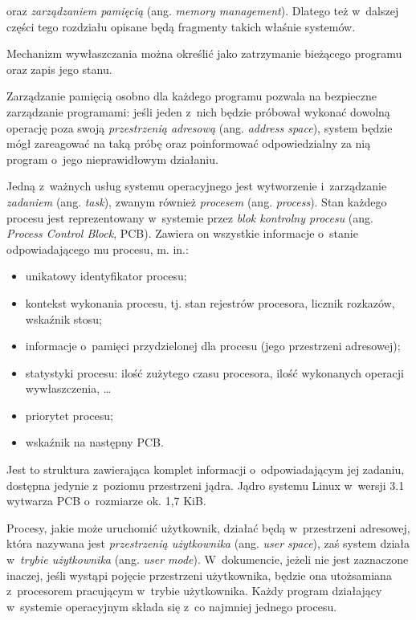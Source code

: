 \documentclass[12pt]{mwart}
\begin{document}
  oraz \emph{zarządzaniem pamięcią} (ang. \emph{memory management}). Dlatego też w~dalszej części tego rozdziału opisane będą fragmenty takich właśnie systemów.
\par
%
\indent
  Mechanizm wywłaszczania można określić jako zatrzymanie bieżącego programu oraz zapis jego stanu.
\par
%
\indent
  Zarządzanie pamięcią osobno dla każdego programu pozwala na bezpieczne zarządzanie programami: jeśli jeden z~nich będzie próbował wykonać dowolną operację
  poza swoją \emph{przestrzenią adresową} (ang. \emph{address space}), system będzie mógł zareagować na taką próbę oraz poinformować odpowiedzialny za nią program
  o~jego nieprawidłowym działaniu.
\par
%
\indent
  Jedną z~ważnych usług systemu operacyjnego jest wytworzenie i~zarządzanie \emph{zadaniem} (ang. \emph{task}), zwanym również \emph{procesem}
  (ang. \emph{process}). Stan każdego procesu jest reprezentowany w~systemie przez \emph{blok kontrolny procesu} (ang. \emph{Process Control Block}, PCB).
  Zawiera on wszystkie informacje o~stanie odpowiadającego mu procesu, m. in.:
  \begin{itemize}
    \item unikatowy identyfikator procesu;
    \item kontekst wykonania procesu, tj. stan rejestrów procesora, licznik rozkazów, wskaźnik stosu;
    \item informacje o~pamięci przydzielonej dla procesu (jego przestrzeni adresowej);
    \item statystyki procesu: ilość zużytego czasu procesora, ilość wykonanych operacji wywłaszczenia, \ldots
    \item priorytet procesu;
    \item wskaźnik na następny PCB.
  \end{itemize}
  Jest to struktura zawierająca komplet informacji o~odpowiadającym jej zadaniu, dostępna jedynie z~poziomu przestrzeni jądra.
  Jądro systemu Linux w~wersji 3.1 wytwarza PCB o~rozmiarze ok. 1,7 KiB.
\par
%
\indent
  Procesy, jakie może uruchomić użytkownik, działać będą w~przestrzeni adresowej, która nazywana jest \emph{przestrzenią użytkownika} (ang. \emph{user space}), zaś
  system działa w~\emph{trybie użytkownika} (ang. \emph{user mode}). W~dokumencie, jeżeli nie jest zaznaczone inaczej,
  jeśli wystąpi pojęcie przestrzeni użytkownika, będzie ona utożsamiana z~procesorem pracującym w~trybie użytkownika.
  Każdy program działający w~systemie operacyjnym składa się z~co najmniej jednego procesu.
\end{document}
